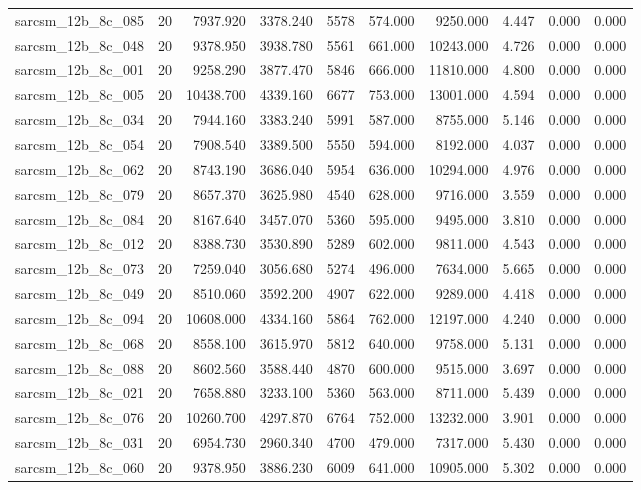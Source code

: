 \begin{tabular}{lrrrrrrrrr}
sarcsm\_12b\_8c\_085 & 20 & 7937.920 & 3378.240 & 5578 & 574.000 & 9250.000 & 4.447 & 0.000 & 0.000 \\
sarcsm\_12b\_8c\_048 & 20 & 9378.950 & 3938.780 & 5561 & 661.000 & 10243.000 & 4.726 & 0.000 & 0.000 \\
sarcsm\_12b\_8c\_001 & 20 & 9258.290 & 3877.470 & 5846 & 666.000 & 11810.000 & 4.800 & 0.000 & 0.000 \\
sarcsm\_12b\_8c\_005 & 20 & 10438.700 & 4339.160 & 6677 & 753.000 & 13001.000 & 4.594 & 0.000 & 0.000 \\
sarcsm\_12b\_8c\_034 & 20 & 7944.160 & 3383.240 & 5991 & 587.000 & 8755.000 & 5.146 & 0.000 & 0.000 \\
sarcsm\_12b\_8c\_054 & 20 & 7908.540 & 3389.500 & 5550 & 594.000 & 8192.000 & 4.037 & 0.000 & 0.000 \\
sarcsm\_12b\_8c\_062 & 20 & 8743.190 & 3686.040 & 5954 & 636.000 & 10294.000 & 4.976 & 0.000 & 0.000 \\
sarcsm\_12b\_8c\_079 & 20 & 8657.370 & 3625.980 & 4540 & 628.000 & 9716.000 & 3.559 & 0.000 & 0.000 \\
sarcsm\_12b\_8c\_084 & 20 & 8167.640 & 3457.070 & 5360 & 595.000 & 9495.000 & 3.810 & 0.000 & 0.000 \\
sarcsm\_12b\_8c\_012 & 20 & 8388.730 & 3530.890 & 5289 & 602.000 & 9811.000 & 4.543 & 0.000 & 0.000 \\
sarcsm\_12b\_8c\_073 & 20 & 7259.040 & 3056.680 & 5274 & 496.000 & 7634.000 & 5.665 & 0.000 & 0.000 \\
sarcsm\_12b\_8c\_049 & 20 & 8510.060 & 3592.200 & 4907 & 622.000 & 9289.000 & 4.418 & 0.000 & 0.000 \\
sarcsm\_12b\_8c\_094 & 20 & 10608.000 & 4334.160 & 5864 & 762.000 & 12197.000 & 4.240 & 0.000 & 0.000 \\
sarcsm\_12b\_8c\_068 & 20 & 8558.100 & 3615.970 & 5812 & 640.000 & 9758.000 & 5.131 & 0.000 & 0.000 \\
sarcsm\_12b\_8c\_088 & 20 & 8602.560 & 3588.440 & 4870 & 600.000 & 9515.000 & 3.697 & 0.000 & 0.000 \\
sarcsm\_12b\_8c\_021 & 20 & 7658.880 & 3233.100 & 5360 & 563.000 & 8711.000 & 5.439 & 0.000 & 0.000 \\
sarcsm\_12b\_8c\_076 & 20 & 10260.700 & 4297.870 & 6764 & 752.000 & 13232.000 & 3.901 & 0.000 & 0.000 \\
sarcsm\_12b\_8c\_031 & 20 & 6954.730 & 2960.340 & 4700 & 479.000 & 7317.000 & 5.430 & 0.000 & 0.000 \\
sarcsm\_12b\_8c\_060 & 20 & 9378.950 & 3886.230 & 6009 & 641.000 & 10905.000 & 5.302 & 0.000 & 0.000 \\

\end{tabular}
